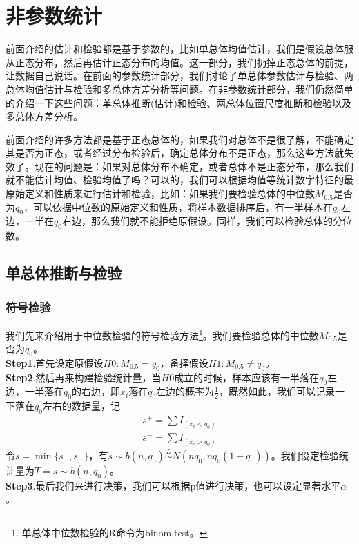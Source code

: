 \section{非参数统计}
    \par
    前面介绍的估计和检验都是基于参数的，比如单总体均值估计，我们是假设总体服从正态分布，然后再估计正态分布的均值。这一部分，我们扔掉正态总体的前提，让数据自己说话。在前面的参数统计部分，我们讨论了单总体参数估计与检验、两总体均值估计与检验和多总体方差分析等问题。在非参数统计部分，我们仍然简单的介绍一下这些问题：单总体推断(估计)和检验、两总体位置尺度推断和检验以及多总体方差分析。
    \par
    前面介绍的许多方法都是基于正态总体的，如果我们对总体不是很了解，不能确定其是否为正态，或者经过分布检验后，确定总体分布不是正态，那么这些方法就失效了。现在的问题是：如果对总体分布不确定，或者总体不是正态分布，那么我们就不能估计均值、检验均值了吗？可以的，我们可以根据均值等统计数字特征的最原始定义和性质来进行估计和检验，比如：如果我们要检验总体的中位数$M_{0.5}$是否为$q_0$，可以依据中位数的原始定义和性质，将样本数据排序后，有一半样本在$q_0$左边，一半在$q_0$右边，那么我们就不能拒绝原假设。同样，我们可以检验总体的分位数。
    \subsection{单总体推断与检验}
        \subsubsection{符号检验}
            \par
            我们先来介绍用于中位数检验的符号检验方法\footnote{单总体中位数检验的R命令为binom.test。}。我们要检验总体的中位数$M_{0.5}$是否为$q_0$。\\
            \textbf{Step1}.首先设定原假设$H0:M_{0.5} = q_0$，备择假设$H1:M_{0.5} \neq q_0$。\\
            \textbf{Step2}.然后再来构建检验统计量，当$H0$成立的时候，样本应该有一半落在$q_0$左边，一半落在$q_0$的右边，即$x_i$落在$q_0$左边的概率为$\frac{1}{2}$，既然如此，我们可以记录一下落在$q_0$左右的数据量，记
            \begin{align*}
            s^+ = \sum I_{(x_i<q_0)}\\
            s^- = \sum I_{(x_i>q_0)}
            \end{align*}
            令$s= \min \{s^+,s^-\}$，有$s\sim b(n,q_0) \overset{L}{\sim}N(nq_0,nq_0(1-q_0))$。我们设定检验统计量为$T = s\sim b(n,q_0) $。\\
            \textbf{Step3}.最后我们来进行决策，我们可以根据p值进行决策，也可以设定显著水平$\alpha$。

